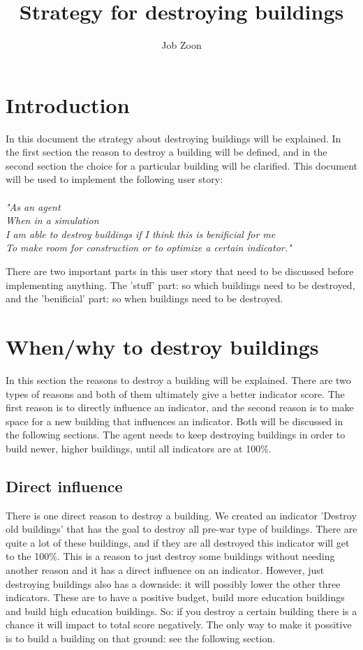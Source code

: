 \documentclass{article}
\author{Job Zoon}
\title{Strategy for destroying buildings}
\begin{document}

\maketitle{}
\newpage{}

\section{Introduction}
In this document the strategy about destroying buildings will be explained. In the first section the reason to destroy a building will be defined, and in the second section the choice for a particular building will be clarified. This document will be used to implement the following user story:\\
\\
\textit{"As an agent\\
When in a simulation\\
I am able to destroy buildings if I think 
this is benificial for me\\
To make room for construction or to 
optimize a certain indicator."\\}

There are two important parts in this user story that need to be discussed before implementing anything. The 'stuff' part: so which buildings need to be destroyed, and the 'benificial' part: so when buildings need to be destroyed.

\section{When/why to destroy buildings}
In this section the reasons to destroy a building will be explained. There are two types of reasons and both of them ultimately give a better indicator score. The first reason is to directly influence an indicator, and the second reason is to make space for a new building that influences an indicator. Both will be discussed in the following sections. The agent needs to keep destroying buildings in order to build newer, higher buildings, until all indicators are at 100\%.


\subsection{Direct influence}
There is one direct reason to destroy a building. We created an indicator 'Destroy old buildings' that has the goal to destroy all pre-war type of buildings. There are quite a lot of these buildings, and if they are all destroyed this indicator will get to the 100\%. This is a reason to just destroy some buildings without needing another reason and it has a direct influence on an indicator. However, just destroying buildings also has a downside: it will possibly lower the other three indicators. These are to have a positive budget, build more education buildings and build high education buildings. So: if you destroy a certain building there is a chance it will impact to total score negatively. The only way to make it possitive is to build a building on that ground: see the following section.
\end{document}

